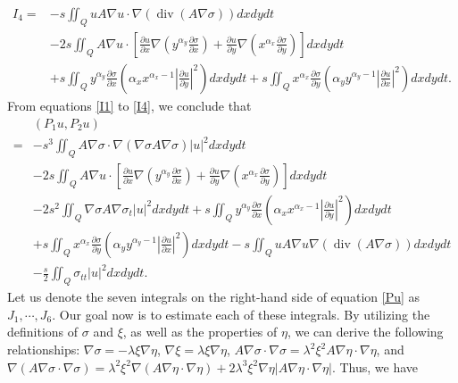 \documentclass[9pt,reqno]{amsart}
\theoremstyle{plain}
\numberwithin{equation}{section}
\numberwithin{theorem}{section}
\DeclareMathOperator*{\Div}{\mathrm{div}}
\begin{document}
	\begin{equation}\label{I4}
		\begin{split}
			I_4 = & -s \iint_Q u A \nabla u\cdot \nabla (\Div(A \nabla \sigma))dx dy dt
			\\
			&-2s \iint_{Q} A\nabla u \cdot \left[ \frac{\partial u}{\partial x} \nabla (y^{\alpha_y} \frac{\partial \sigma}{\partial x}) + \frac{\partial u}{\partial y} \nabla (x^{\alpha_x} \frac{\partial \sigma}{\partial y}) \right]  dx dy dt\\
			&+ s\iint_{Q} y^{\alpha_y} \frac{\partial \sigma}{\partial x} (\alpha_x x^{\alpha_x-1}\left| \frac{\partial u}{\partial y}\right| ^2) dx dydt
			+ s\iint_{Q} x^{\alpha_x} \frac{\partial \sigma}{\partial y} (\alpha_y y^{\alpha_y-1}\left| \frac{\partial u}{\partial x}\right| ^2) dx dydt. 
		\end{split}
	\end{equation}
	From equations \eqref{I1} to \eqref{I4}, we conclude that
	\begin{equation}\label{Pu}
		\begin{aligned}
			&\left(P_1 u, P_2 u\right)\\
			= & -s^3 \iint_Q A \nabla \sigma\cdot \nabla(\nabla \sigma A \nabla \sigma)|u|^2 dx dy dt\\
			&-2s \iint_{Q} A\nabla u \cdot \left[ \frac{\partial u}{\partial x} \nabla (y^{\alpha_y} \frac{\partial \sigma}{\partial x}) + \frac{\partial u}{\partial y} \nabla (x^{\alpha_x} \frac{\partial \sigma}{\partial y}) \right]  dx dy dt \\
			& -2s^2 \iint_Q \nabla \sigma A \nabla \sigma_t|u|^2 dx dy dt+ s\iint_{Q} y^{\alpha_y} \frac{\partial \sigma}{\partial x} \left( \alpha_x x^{\alpha_x-1}\left| \frac{\partial u}{\partial y}\right| ^2\right)  dx dydt\\
			&+ s\iint_{Q} x^{\alpha_x} \frac{\partial \sigma}{\partial y} \left( \alpha_y y^{\alpha_y-1}\left| \frac{\partial u}{\partial x}\right| ^2\right)  dx dydt
			-s \iint_Q u A \nabla u \nabla(\Div(A \nabla \sigma)) dx dy dt\\
			&-\frac{s}{2} \iint_Q \sigma_{t t}|u|^2 dx dy dt.
		\end{aligned}
	\end{equation}
	Let us denote the seven integrals on the right-hand side of equation \eqref{Pu} as $J_1, \cdots, J_6$. Our goal now is to estimate each of these integrals. By utilizing the definitions of $\sigma$ and $\xi$, as well as the properties of $\eta$, we can derive the following relationships: $\nabla \sigma = - \lambda \xi \nabla \eta$, $\nabla \xi = \lambda \xi \nabla \eta$, $A \nabla \sigma \cdot \nabla \sigma = \lambda^2 \xi^2 A\nabla \eta \cdot \nabla \eta$, and $\nabla( A \nabla \sigma \cdot \nabla \sigma) = \lambda^2 \xi^2 \nabla (A\nabla \eta \cdot \nabla \eta) + 2\lambda^3 \xi^2 \nabla \eta \left| A \nabla \eta \cdot \nabla \eta \right|$. Thus, we have
\end{document}
